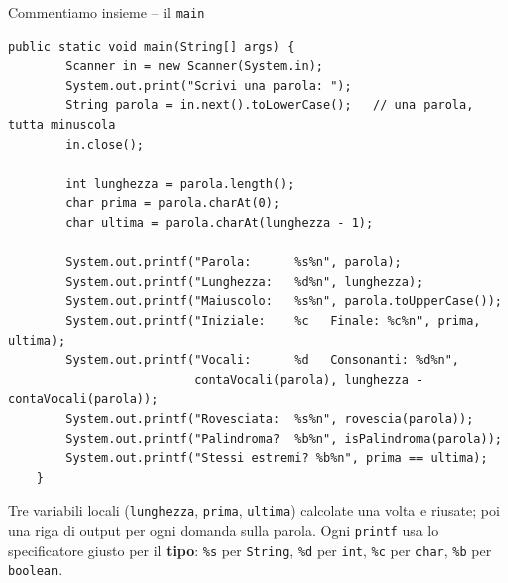 \documentclass[10pt,aspectratio=169]{beamer}
\begin{document}
\begin{frame}[fragile]{Commentiamo insieme -- il \texttt{main}}
\begin{lstlisting}[basicstyle=\ttfamily\scriptsize]
    public static void main(String[] args) {
        Scanner in = new Scanner(System.in);
        System.out.print("Scrivi una parola: ");
        String parola = in.next().toLowerCase();   // una parola, tutta minuscola
        in.close();

        int lunghezza = parola.length();
        char prima = parola.charAt(0);
        char ultima = parola.charAt(lunghezza - 1);

        System.out.printf("Parola:      %s%n", parola);
        System.out.printf("Lunghezza:   %d%n", lunghezza);
        System.out.printf("Maiuscolo:   %s%n", parola.toUpperCase());
        System.out.printf("Iniziale:    %c   Finale: %c%n", prima, ultima);
        System.out.printf("Vocali:      %d   Consonanti: %d%n",
                          contaVocali(parola), lunghezza - contaVocali(parola));
        System.out.printf("Rovesciata:  %s%n", rovescia(parola));
        System.out.printf("Palindroma?  %b%n", isPalindroma(parola));
        System.out.printf("Stessi estremi? %b%n", prima == ultima);
    }
\end{lstlisting}
\small Tre variabili locali (\texttt{lunghezza}, \texttt{prima}, \texttt{ultima}) calcolate una volta e riusate; poi una riga di output per ogni domanda sulla parola. Ogni \texttt{printf} usa lo specificatore giusto per il \textbf{tipo}: \texttt{\%s} per \texttt{String}, \texttt{\%d} per \texttt{int}, \texttt{\%c} per \texttt{char}, \texttt{\%b} per \texttt{boolean}.
\end{frame}
\end{document}
